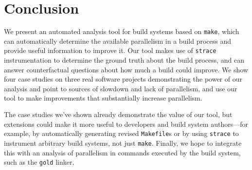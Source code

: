 \documentclass[sigconf,10pt,authorversion]{acmart}\settopmatter{printfolios=true,printccs=false,printacmref=false}
\begin{document}


\section{Conclusion}

We present an automated analysis tool for build systems based on
\verb|make|, which can automatically determine the available
parallelism in a build process and provide useful information to
improve it. Our tool makes use of \verb|strace| instrumentation to
determine the ground truth about the build process, and can answer
counterfactual questions about how much a build could improve.
%
We show four case studies on three real software projects
demonstrating the power of our analysis and point to sources of
slowdown and lack of parallelism, and use our tool to make
improvements that substantially increase parallelism.

The case studies we've shown already demonstrate the value of our
tool, but extensions could make it more useful to developers and build
system authors---for example, by automatically generating revised
\verb|Makefile|s or by using \verb|strace| to instrument arbitrary
build systems, not just \verb|make|. Finally, we hope to integrate
this with an analysis of parallelism in commands executed by the build
system, such as the \verb|gold| linker.

 

\balance
\end{document}
